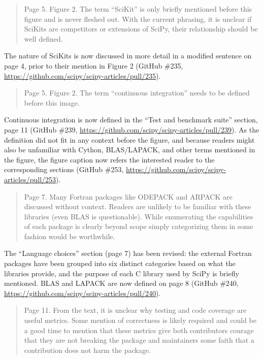 \documentclass[10pt,stdletter,dateno]{newlfm}
\begin{document}
\begin{newlfm}
\begin{quote}
Page 5. Figure 2. The term ``SciKit'' is only briefly mentioned before this figure and is never fleshed out. With the current phrasing, it is unclear if SciKits are competitors or extensions of SciPy, their relationship should be well defined.
\end{quote}

The nature of SciKits is now discussed in more detail in a modified sentence on page 4, prior to their mention in Figure 2 (GitHub \#235, \url{https://github.com/scipy/scipy-articles/pull/235}). 

\begin{quote}
Page 5. Figure 2. The term ``continuous integration'' needs to be defined before this image.
\end{quote}

Continuous integration is now defined in the ``Test and benchmark suite'' section, page 11 (GitHub \#239, \url{https://github.com/scipy/scipy-articles/pull/239}). As the definition did not fit in any context before the figure, and because readers might also be unfamiliar with Cython, BLAS/LAPACK, and other terms mentioned in the figure, the figure caption now refers the interested reader to the corresponding sections (GitHub \#253, \url{https://github.com/scipy/scipy-articles/pull/253}).

\begin{quote}
Page 7. Many Fortran packages like ODEPACK and ARPACK are discussed without context. Readers are unlikely to be familiar with these libraries (even BLAS is questionable). While enumerating the capabilities of each package is clearly beyond scope simply categorizing them in some fashion would be worthwhile.
\end{quote}

The ``Language choices'' section (page 7) has been revised: the external Fortran packages have been grouped into six distinct categories based on what the libraries provide, and the purpose of each C library used by SciPy is briefly mentioned. BLAS and LAPACK are now defined on page 8 (GitHub \#240, \url{https://github.com/scipy/scipy-articles/pull/240}). 

\begin{quote}
Page 11. From the text, it is unclear why testing and code coverage are useful metrics. Some mention of correctness is likely required and could be a good time to mention that these metrics give both contributors courage that they are not breaking the package and maintainers some faith that a contribution does not harm the package.
\end{quote}


\end{newlfm}
\end{document}
